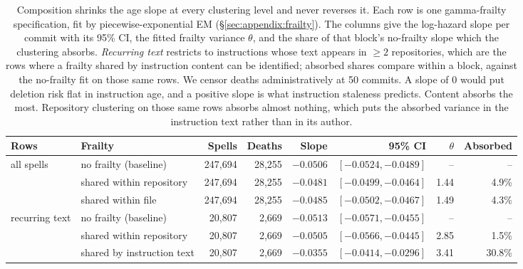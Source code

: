 \begin{table}[t]
  \centering\small
  \begin{tabular}{@{}llrrrrrr@{}}
    \toprule
    Rows & Frailty & Spells & Deaths & Slope & 95\% CI & $\theta$ & Absorbed \\
    \midrule
    all spells & no frailty (baseline) & 247,694 & 28,255 & $-0.0506$ & $[-0.0524, -0.0489]$ & -- & -- \\
     & shared within repository & 247,694 & 28,255 & $-0.0481$ & $[-0.0499, -0.0464]$ & 1.44 & 4.9\% \\
     & shared within file & 247,694 & 28,255 & $-0.0485$ & $[-0.0502, -0.0467]$ & 1.49 & 4.3\% \\
    recurring text & no frailty (baseline) & 20,807 & 2,669 & $-0.0513$ & $[-0.0571, -0.0455]$ & -- & -- \\
     & shared within repository & 20,807 & 2,669 & $-0.0505$ & $[-0.0566, -0.0445]$ & 2.85 & 1.5\% \\
     & shared by instruction text & 20,807 & 2,669 & $-0.0355$ & $[-0.0414, -0.0296]$ & 3.41 & 30.8\% \\
    \bottomrule
  \end{tabular}
  \caption{
    Composition shrinks the age slope at every clustering level and never reverses it.
    Each row is one gamma-frailty specification, fit by piecewise-exponential EM
    (\S\ref{sec:appendix:frailty}). The columns give the log-hazard slope per commit with its 95\%
    CI, the fitted frailty variance $\theta$, and the share of that block's no-frailty slope which
    the clustering absorbs. \emph{Recurring text} restricts to instructions whose text appears in
    $\ge 2$ repositories, which are the rows where a frailty shared by instruction content can be
    identified; absorbed shares compare within a block, against the no-frailty fit on those same
    rows. We censor deaths administratively at 50 commits. A slope of $0$ would put deletion risk
    flat in instruction age, and a positive slope is what instruction staleness predicts. Content
    absorbs the most. Repository clustering on those same rows absorbs almost nothing, which puts
    the absorbed variance in the instruction text rather than in its author.
  }
  \label{tab:frailty}
\end{table}
